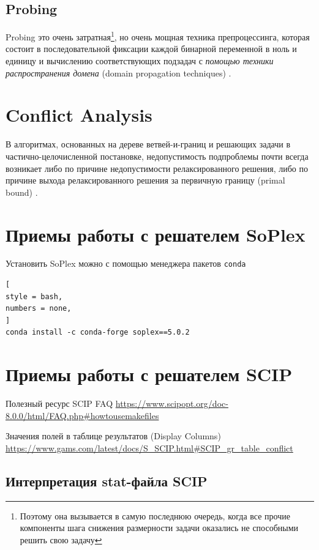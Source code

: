 \documentclass[%
	11pt,
	a4paper,
	utf8,
		]{article}
\begin{document}
\subsection{Probing}

Probing это очень затратная\footnote{Поэтому она вызывается в самую последнюю очередь, когда все прочие компоненты шага снижения размерности задачи оказались не способными решить свою задачу}, но очень мощная техника препроцессинга, которая состоит в последовательной фиксации каждой бинарной переменной в ноль и единицу и вычислению соответствующих подзадач с \emph{помощью техники распространения домена} (domain propagation techniques) \cite[]{achterberg:constr_int_prog}. 

\section{Conflict Analysis}

В алгоритмах, основанных на дереве ветвей-и-границ и решающих задачи в частично-целочисленной постановке, недопустимость подпроблемы почти всегда возникает либо по причине недопустимости релаксированного решения, либо по причине выхода релаксированного решения за первичную границу (primal bound) \cite[]{achterberg:constr_int_prog}. 


\section{Приемы работы с решателем SoPlex}

Установить SoPlex можно с помощью менеджера пакетов \verb|conda|
\begin{lstlisting}[
style = bash,
numbers = none,
]
conda install -c conda-forge soplex==5.0.2 
\end{lstlisting}


\section{Приемы работы с решателем SCIP}

Полезный ресурс SCIP FAQ \url{https://www.scipopt.org/doc-8.0.0/html/FAQ.php#howtousemakefiles}

Значения полей в таблице результатов (Display Columns) \url{https://www.gams.com/latest/docs/S_SCIP.html#SCIP_gr_table_conflict}

\subsection{Интерпретация stat-файла SCIP}
\end{document}

